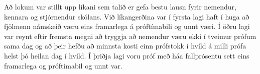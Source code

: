 \documentclass[12pt]{article}
\begin{document}
\bigskip 
Að lokum var stillt upp líkani sem talið er gefa bestu lausn fyrir nemendur, kennara og stjórnendur skólans.  Við líkangerðina var í fyrsta lagi haft í huga að fjölmenn námskeið væru eins framarlega á próftímabili og unnt væri. Í öðru lagi var reynt eftir fremsta megni að tryggja að nemendur væru ekki í tveimur prófum sama dag og að þeir hefðu að minnsta kosti einn prófstokk í hvíld á milli prófa helst þó heilan dag í hvíld. Í þriðja lagi voru próf með háa fallprósentu sett eins framarlega og próftímabil og unnt var. 
\end{document}
